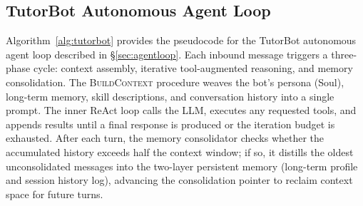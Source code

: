 \subsection{TutorBot Autonomous Agent Loop}
\label{app:tutorbot}

Algorithm~\ref{alg:tutorbot} provides the pseudocode for the TutorBot autonomous agent loop described in \S\ref{sec:agentloop}.
Each inbound message triggers a three-phase cycle: context assembly, iterative tool-augmented reasoning, and memory consolidation.
The \textsc{BuildContext} procedure weaves the bot's persona (Soul), long-term memory, skill descriptions, and conversation history into a single prompt.
The inner ReAct loop calls the LLM, executes any requested tools, and appends results until a final response is produced or the iteration budget is exhausted.
After each turn, the memory consolidator checks whether the accumulated history exceeds half the context window; if so, it distills the oldest unconsolidated messages into the two-layer persistent memory (long-term profile and session history log), advancing the consolidation pointer to reclaim context space for future turns.

